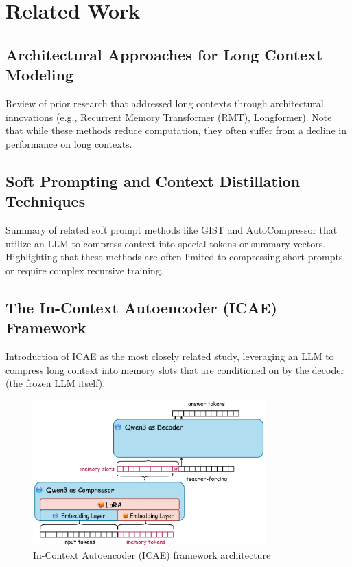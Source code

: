 \chapter{Related Work}


\section{Architectural Approaches for Long Context Modeling}

Review of prior research that addressed long contexts through architectural innovations (e.g., Recurrent Memory Transformer (RMT), Longformer).
Note that while these methods reduce computation, they often suffer from a decline in performance on long contexts.



\section{Soft Prompting and Context Distillation Techniques}

Summary of related soft prompt methods like GIST and AutoCompressor that utilize an LLM to compress context into special tokens or summary vectors.
Highlighting that these methods are often limited to compressing short prompts or require complex recursive training.


\section{The In-Context Autoencoder (ICAE) Framework}

Introduction of ICAE \cite{ge_-context_2024} as the most closely related study, leveraging an LLM to compress long context into memory slots that are conditioned on by the decoder (the frozen LLM itself).

\begin{figure}[hbt]
  \centering
  \includegraphics[width=0.8\textwidth]{graphs/icae.jpeg}
  \caption{In-Context Autoencoder (ICAE) framework architecture}
  \label{fig:icae}
\end{figure}
